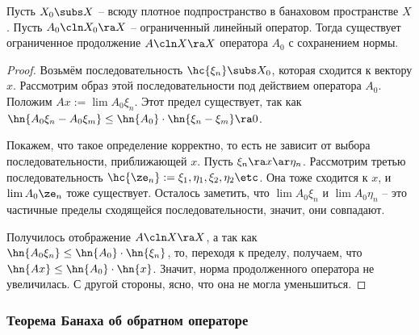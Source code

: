 \documentclass[a4paper]{article}
\begin{document}
\begin{stm}
Пусть $X_0 \subs X$ -- всюду плотное подпространство в банаховом пространстве $X$.
Пусть $A_0\cln X_0 \ra X$ -- ограниченный линейный оператор.
Тогда существует ограниченное продолжение $A\cln X\ra X$ оператора $A_0$ с сохранением нормы.
\end{stm}
\begin{proof}
Возьмём последовательность $\hc{\xi_n} \subs X_0$, которая сходится к вектору $x$.
Рассмотрим образ этой последовательности под действием оператора $A_0$.
Положим $Ax := \lim A_0 \xi_n$. Этот предел существует, так как
$\hn{A_0 \xi_n - A_0\xi_m} \le \hn{A_0}\cdot\hn{\xi_n-\xi_m} \ra 0$.

Покажем, что такое определение корректно, то есть не зависит от выбора последовательности,
приближающей $x$. Пусть $\xi_n \ra x \ar \eta_n$.
Рассмотрим третью последовательность $\hc{\ze_n} := \xi_1,\eta_1,\xi_2,\eta_2\etc$.
Она тоже сходится к $x$, и $\lim A_0 \ze_n$ тоже существует. Осталось заметить, что
$\lim A_0 \xi_n$ и $\lim A_0 \eta_n$ -- это частичные пределы сходящейся последовательности,
значит, они совпадают.

Получилось отображение $A\cln X \ra X$, а так как
$\hn{A_0 \xi_n} \le \hn{A_0} \cdot \hn{\xi_n}$, то, переходя к пределу, получаем, что
$\hn{Ax} \le \hn{A_0} \cdot \hn{x}$. Значит, норма продолженного оператора не увеличилась.
С другой стороны, ясно, что она не могла уменьшиться.
\end{proof}

\subsubsection{Теорема Банаха об обратном операторе}
\end{document}
